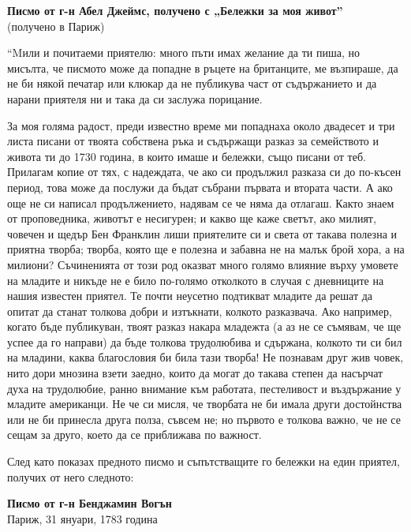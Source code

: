 \documentclass[12pt]{book}
\begin{document}
\textbf{Писмо от г-н Абел Джеймс, получено с „Бележки за моя живот”}\\
(получено в Париж)

“Mили и почитаеми приятелю: много пъти имах желание да ти пиша, но мисълта, че писмото може да попадне в ръцете на британците, ме възпираше, да не би някой печатар или клюкар да не публикува част от съдържанието и да нарани приятеля ни и така да си заслужа порицание. 

За моя голяма радост, преди известно време ми попаднаха около двадесет и три листа писани от твоята собствена ръка и съдържащи разказ за семейството и живота ти до 1730 година, в които имаше и бележки, също писани от теб. Прилагам копие от тях, с надеждата, че ако си продължил разказа си до по-късен период, това може да послужи да бъдат събрани първата и втората части. А ако още не си написал продължението, надявам се че няма да отлагаш. Както знаем от проповедника, животът е несигурен; и какво ще каже светът, ако милият, човечен и щедър Бен Франклин лиши приятелите си и света от такава полезна и приятна творба; творба, която ще е полезна и забавна не на малък брой хора, а на милиони? Съчиненията от този род оказват много голямо влияние върху умовете на младите и никъде не е било по-голямо отколкото в случая с дневниците на нашия известен приятел. Те почти неусетно подтикват младите да решат да опитат да станат толкова добри и изтъкнати, колкото разказвача. Ако например, когато бъде публикуван, твоят разказ накара младежта (а аз не се съмявам, че ще успее да го направи) да бъде толкова трудолюбива и сдържана, колкото ти си бил на младини, каква благословия би била тази творба! Не познавам друг жив човек, нито дори мнозина взети заедно, които да могат до такава степен да насърчат духа на трудолюбие, ранно внимание към работата, пестеливост и въздържание у младите американци. Не че си мисля, че творбата не би имала други достойнства или не би принесла друга полза, съвсем не; но първото е толкова важно, че не се сещам за друго, което да се приближава по важност.

След като показах предното писмо и съпътстващите го бележки на един приятел, получих от него следното:

\textbf{Писмо от г-н Бенджамин Вогън} \\
Париж, 31 януари, 1783 година
\end{document}
